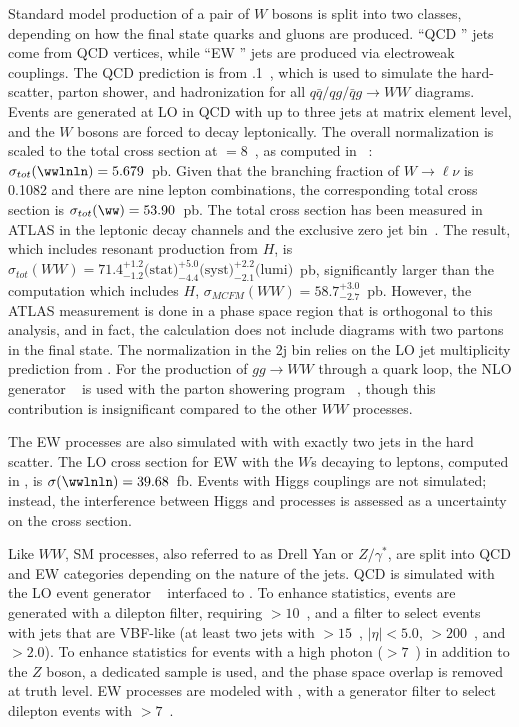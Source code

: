 Standard model production of a pair of $W$ bosons is split into two
classes, depending on how the final state quarks and gluons are
produced. ``QCD \ww'' jets come from QCD vertices, while ``EW \ww''
jets are produced via electroweak couplings. The QCD \ww prediction is from .1~\cite{bib:Gleisberg:2008ta}, which is used to
simulate the hard-scatter, parton shower, and hadronization for all
$q\bar{q}/qg/\bar{q}g\rightarrow{WW}$ diagrams. Events are generated
at LO in QCD with up to three jets at matrix element level, and the
$W$ bosons are forced to decay leptonically. The overall normalization is
scaled to the total \ww cross section at \sqrts$=8$~\tev, as computed
in \MCFM~\cite{bib:Campbell:2011bn}: $\sigma_{tot}(\wwlnln) = 5.679$~pb. Given that the branching
fraction of $W\rightarrow{\ell\nu}$ is 0.1082 and there are nine
lepton combinations, the corresponding total cross section is
$\sigma_{tot}(\ww) = 53.90$~pb. The total \ww cross section has been
measured in ATLAS in the \ww leptonic decay channels and the exclusive
zero jet bin~\cite{bib:ww_cross_section}. The result, which includes
resonant \ww production from $H$, is
$\sigma_{tot}(WW) = 71.4^{+1.2}_{-1.2} \textrm{(stat)} ^{+5.0}_{-4.4}
\textrm{(syst)}^{+2.2}_{-2.1}\textrm{(lumi)}$~pb, significantly larger
than the \MCFM computation which includes $H$, $\sigma_{MCFM}(WW) =
58.7^{+3.0}_{-2.7}$~pb. However, the ATLAS measurement is done in a
phase space region that is orthogonal to this analysis, and in fact,
the \MCFM calculation does not include diagrams with two partons in the final
state. The normalization in the 2j bin relies on the LO jet
multiplicity prediction from \SHERPA. For the production of
$gg\rightarrow{WW}$ through a quark loop, the NLO generator \GGTOWW~\cite{bib:Binoth:2006mf} is
used with the parton showering program
\HERWIG~\cite{bib:Corcella:2000bw}, though this contribution is
insignificant compared to the other $WW$ processes. 

The EW \ww processes are also simulated with \SHERPA with exactly two
jets in the hard scatter. The LO cross section for EW \ww with the
$W$s decaying to leptons, computed in \SHERPA, is $\sigma(\wwlnln) =
39.68$~fb. Events with Higgs couplings are not simulated; instead, the
interference between Higgs and \ww processes is assessed as a
uncertainty on the cross section. 

Like $WW$, SM \zjets processes, also referred to as Drell Yan or
$Z/\gamma^\ast$, are split into QCD and EW categories
depending on the nature of the jets. QCD \zjets is simulated with the
LO event generator \ALPGEN~\cite{bib:Mangano:2002ea} interfaced to
\HERWIG. To enhance statistics, events are generated with a dilepton
filter, requiring \mll$>10$~\gev, and a filter to select events with jets that are VBF-like (at
least two jets with \pt$>15$~\gev, $|\eta| < 5.0$, \mjj$>200$~\gev,
and \dyjj$>2.0$). To enhance statistics for events with a high \pt
photon (\pt$>7$~\gev) in addition to the $Z$ boson, a dedicated
\SHERPA sample is used, and the phase space overlap is removed at truth
level. EW \zjets processes are modeled with \SHERPA, with a generator
filter to select dilepton events with \mll$>7$~\gev. 

